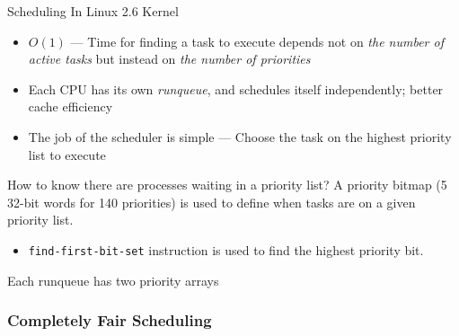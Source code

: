 \begin{frame}{Scheduling In Linux 2.6 Kernel}
  \begin{itemize}
  \item[\good] $O(1)$ --- Time for finding a task to execute depends not on \emph{the
      number of active tasks} but instead on \emph{the number of priorities}
  \item[\good] Each CPU has its own \emph{runqueue}, and schedules itself independently; better cache
    efficiency
  \item The job of the scheduler is simple --- Choose the task on the highest priority list to
    execute
  \end{itemize}
  \begin{block}{How to know there are processes waiting in a priority list?}
    A priority bitmap (5 32-bit words for 140 priorities) is used to define when tasks are on a
    given priority list.
    \begin{itemize}
    \item \texttt{find-first-bit-set} instruction is used to find the highest priority bit.
    \end{itemize}
  \end{block}
\end{frame}

\begin{frame}%
  \begin{block}{Each runqueue has two priority arrays}
    \begin{center}
    \end{center}
  \end{block}
\end{frame}

\subsubsection{Completely Fair Scheduling}
\label{sec:compl-fair-sched}

